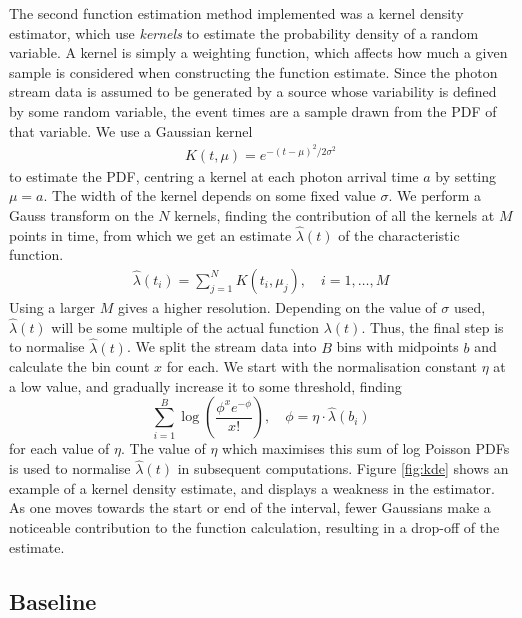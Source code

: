 \documentclass[a4paper,11pt]{article}
\begin{document}
   The second function estimation method implemented was a kernel density
   estimator, which use \emph{kernels} to estimate the probability density of a
   random variable. A kernel is simply a weighting function, which affects how
   much a given sample is considered when constructing the function
   estimate. Since the photon stream data is assumed to be generated by a source
   whose variability is defined by some random variable, the event times are a
   sample drawn from the PDF of that variable. We use a Gaussian kernel
   \begin{align}
   K(t,\mu)=e^{-(t-\mu)^2/2\sigma^2}
   \end{align}
   to estimate the PDF, centring a kernel at each photon arrival time $a$ by
   setting $\mu=a$. The width of the kernel depends on some fixed value
   $\sigma$. We perform a Gauss transform on the $N$ kernels, finding the
   contribution of all the kernels at $M$ points in time, from which we get an
   estimate $\hat{\lambda}(t)$ of the characteristic function.
   \begin{align}
   \hat{\lambda}(t_i) = \sum_{j=1}^N K(t_i,\mu_j), \quad i=1,\dots,M
   \end{align}
   Using a larger $M$ gives a higher resolution. Depending on the value of
   $\sigma$ used, $\hat{\lambda}(t)$ will be some multiple of the actual
   function $\lambda(t)$. Thus, the final step is to normalise
   $\hat{\lambda}(t)$. We split the stream data into $B$ bins with midpoints $b$
   and calculate the bin count $x$ for each. We start with the normalisation
   constant $\eta$ at a low value, and gradually increase it to some threshold,
   finding
   \begin{equation}\label{eq:normcalc}
   \sum_{i=1}^B
   \log\left(\frac{\phi^xe^{-\phi}}{x!}\right), \quad \phi=\eta\cdot\hat{\lambda}(b_i)
   \end{equation}
   for each value of $\eta$. The value of $\eta$ which maximises this sum of log
   Poisson PDFs is used to normalise $\hat{\lambda}(t)$ in subsequent
   computations. Figure \ref{fig:kde} shows an example of a kernel density
   estimate, and displays a weakness in the estimator. As one moves towards the
   start or end of the interval, fewer Gaussians make a noticeable contribution
   to the function calculation, resulting in a drop-off of the estimate.
\subsection{Baseline}
\label{sec-4-2}
\end{document}
